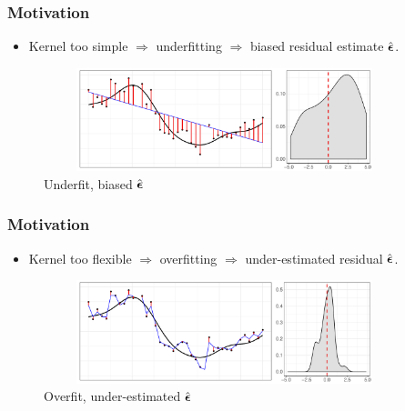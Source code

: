 \documentclass{beamer}
\begin{document}
\begin{frame}
\frametitle{Motivation}
\begin{itemize}
\item Kernel too simple $\Rightarrow$ underfitting $\Rightarrow$ biased  residual estimate $\hat{\boldsymbol{\epsilon}}$.
\end{itemize}

\begin{figure}
\includegraphics[height=3cm, width=10.5cm]{./plot/under_final} 
\caption{Underfit, biased $\hat{\boldsymbol{\epsilon}}$}
\end{figure}

\end{frame}

\begin{frame}
\frametitle{Motivation}
\begin{itemize}
\item Kernel too flexible $\Rightarrow$ overfitting $\Rightarrow$ under-estimated residual $\hat{\boldsymbol{\epsilon}}$.
\end{itemize}

\begin{figure}
\includegraphics[height=3cm, width=10.5cm]{./plot/over_final} 
\caption{Overfit, under-estimated $\hat{\boldsymbol{\epsilon}}$}
\end{figure}

\end{frame}
\end{document}
